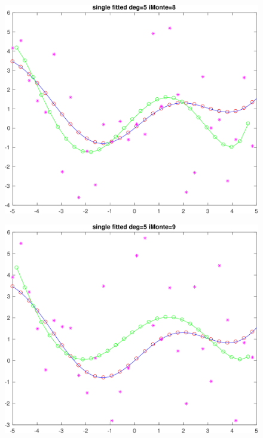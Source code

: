 \documentclass[11pt]{article}
\begin{document}
\begin{figure}[h!]
\centering\includegraphics[scale=0.1]{single_poly_d_5_iMonte_8.png}
\end{figure}


\begin{figure}[h!]
\centering\includegraphics[scale=0.1]{single_poly_d_5_iMonte_9.png}
\end{figure}
\end{document}
